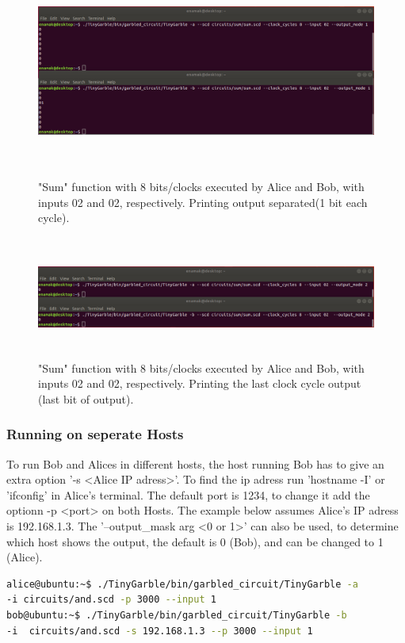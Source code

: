 \begin{refsection}
\begin{figure}[H]
	\centering
	\includegraphics[width=1\textwidth, height=7cm]{./sdf/tiny_garble/figures/tinygarble_sum_1.png}
    \caption{"Sum" function with 8 bits/clocks executed by Alice and Bob, with inputs 02 and 02, respectively. Printing output separated(1 bit each cycle).}\label{fig:tinygarble_sum_1}
\end{figure}

\begin{figure}[H]
	\centering
	\includegraphics[width=1\textwidth, height=4cm]{./sdf/tiny_garble/figures/tinygarble_sum_2.png}
    \caption{"Sum" function with 8 bits/clocks executed by Alice and Bob, with inputs 02 and 02, respectively. Printing the last clock cycle output (last bit of output).}\label{fig:tinygarble_sum_2}
\end{figure}

\subsubsection{Running on seperate Hosts}

To run Bob and Alices in different hosts, the host running Bob has to give an extra option '-s <Alice IP adress>'. To find the ip adress run 'hostname -I' or 'ifconfig' in Alice's terminal. The default port is 1234, to change it add the optionn -p <port> on both Hosts. The example below assumes Alice's IP adress is 192.168.1.3. The '--output\_mask arg <0 or 1>' can also be used, to determine which host shows the output, the default is 0 (Bob), and can be changed to 1 (Alice).
\begin{lstlisting}[caption={Installation of Yosys-abc for Ubuntu 15.04>}, language=bash, captionpos=b]
alice@ubuntu:~$ ./TinyGarble/bin/garbled_circuit/TinyGarble -a 
-i circuits/and.scd -p 3000 --input 1
bob@ubuntu:~$ ./TinyGarble/bin/garbled_circuit/TinyGarble -b 
-i  circuits/and.scd -s 192.168.1.3 --p 3000 --input 1
\end{lstlisting}


\end{refsection}
